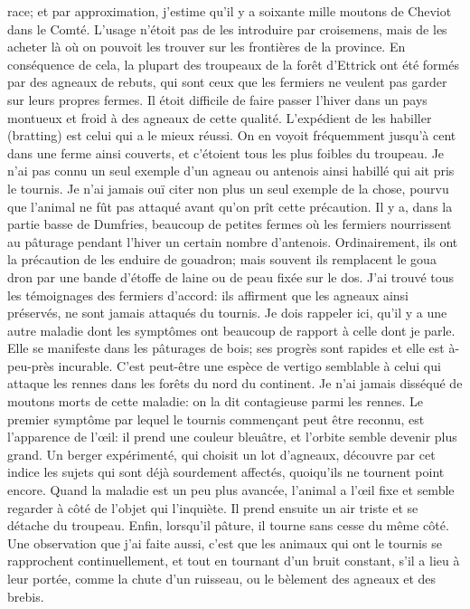 race; et par approximation, j'estime qu'il y a soixante mille moutons de Cheviot dans le Comté. L'usage n'étoit pas de les introduire par croisemens, mais de les acheter là où on pouvoit les trouver sur les frontières de la province. En conséquence de cela, la plupart des troupeaux de la forêt d'Ettrick ont été formés par des agneaux de rebuts, qui sont ceux que les fermiers ne veulent pas garder sur leurs propres fermes. Il étoit difficile de faire passer l'hiver dans un pays montueux et froid à des agneaux de cette qualité. L'expédient de les habiller (bratting) est celui qui a le mieux réussi. On en voyoit fréquemment jusqu'à cent dans une ferme ainsi couverts, et c'étoient tous les plus foibles du troupeau. Je n'ai pas connu un seul exemple d'un agneau ou antenois ainsi habillé qui ait pris le tournis. Je n'ai jamais ouï citer non plus un seul exemple de la chose, pourvu que l'animal ne fût pas attaqué avant qu'on prît cette précaution. Il y a, dans la partie basse de Dumfries, beaucoup de petites fermes où les fermiers nourrissent au pâturage pendant l'hiver un certain nombre d'antenois. Ordinairement, ils ont la précaution de les enduire de gouadron; mais souvent ils remplacent le goua\setcounter{page}{246} dron par une bande d'étoffe de laine ou de peau fixée sur le dos. J'ai trouvé tous les témoignages des fermiers d'accord: ils affirment que les agneaux ainsi préservés, ne sont jamais attaqués du tournis. Je dois rappeler ici, qu'il y a une autre maladie dont les symptômes ont beaucoup de rapport à celle dont je parle. Elle se manifeste dans les pâturages de bois; ses progrès sont rapides et elle est à-peu-près incurable. C'est peut-être une espèce de vertigo semblable à celui qui attaque les rennes dans les forêts du nord du continent. Je n'ai jamais disséqué de moutons morts de cette maladie: on la dit contagieuse parmi les rennes. Le premier symptôme par lequel le tournis commençant peut être reconnu, est l'apparence de l'œil: il prend une couleur bleuâtre, et l'orbite semble devenir plus grand. Un berger expérimenté, qui choisit un lot d'agneaux, découvre par cet indice les sujets qui sont déjà sourdement affectés, quoiqu'ils ne tournent point encore. Quand la maladie est un peu plus avancée, l'animal a l'œil fixe et semble regarder à côté de l'objet qui l'inquiète. Il prend ensuite un air triste et se détache du troupeau. Enfin, lorsqu'il pâture, il tourne sans cesse du même côté. Une observation que j'ai faite aussi, c'est\setcounter{page}{247} que les animaux qui ont le tournis se rapprochent continuellement, et tout en tournant d'un bruit constant, s'il a lieu à leur portée, comme la chute d'un ruisseau, ou le bèlement des agneaux et des brebis.
